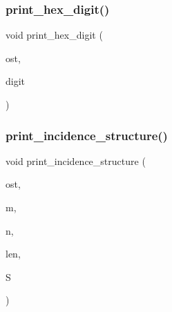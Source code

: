 \mbox{\label{util_8_c_a36c64a828eefed0a0cfdd6186ec92c31}} 
\subsubsection{\texorpdfstring{print\+\_\+hex\+\_\+digit()}{print\_hex\_digit()}}
{\footnotesize\ttfamily void print\+\_\+hex\+\_\+digit (\begin{DoxyParamCaption}\item[{ostream \&}]{ost,  }\item[{\mbox{\hyperlink{galois_8h_a09fddde158a3a20bd2dcadb609de11dc}{I\+NT}}}]{digit }\end{DoxyParamCaption})}

\mbox{\label{util_8_c_aa7c640315296b0948ebccbfa731de5cf}} 
\subsubsection{\texorpdfstring{print\+\_\+incidence\+\_\+structure()}{print\_incidence\_structure()}}
{\footnotesize\ttfamily void print\+\_\+incidence\+\_\+structure (\begin{DoxyParamCaption}\item[{ostream \&}]{ost,  }\item[{\mbox{\hyperlink{galois_8h_a09fddde158a3a20bd2dcadb609de11dc}{I\+NT}}}]{m,  }\item[{\mbox{\hyperlink{galois_8h_a09fddde158a3a20bd2dcadb609de11dc}{I\+NT}}}]{n,  }\item[{\mbox{\hyperlink{galois_8h_a09fddde158a3a20bd2dcadb609de11dc}{I\+NT}}}]{len,  }\item[{\mbox{\hyperlink{galois_8h_a09fddde158a3a20bd2dcadb609de11dc}{I\+NT}} $\ast$}]{S }\end{DoxyParamCaption})}

\mbox{\label{util_8_c_ab4d187a9b89a64102b971201b789b653}} 
